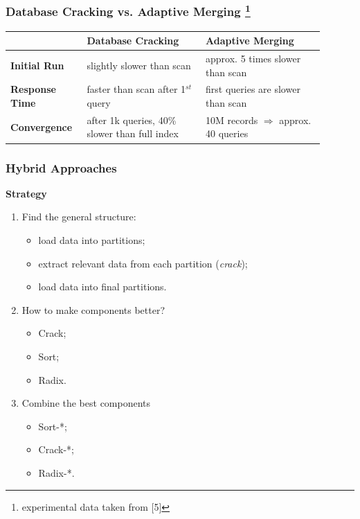 \documentclass{beamer}
\begin{document}
\begin{frame}
\frametitle{Database Cracking vs. Adaptive Merging \footnote{experimental data taken from [5]}}
\begin{tabular}{| M{0.2\linewidth} | M{0.35\linewidth} | M{0.35\linewidth} |}
\hline 
 & \textbf{Database Cracking} & \textbf{Adaptive Merging} \\ 
\hline 
\textbf{Initial Run} & \color{green} slightly slower than scan & \color{red} approx. 5 times slower than scan \\ 
\hline 
\textbf{Response Time} & \color{green} faster than scan after 1$^{st}$ query & \color{red} first queries are slower than scan \\ 
\hline 
\textbf{Convergence} & \color{red} after 1k queries, 40\% slower than full index & \color{green} 10M records $\Rightarrow$ approx. 40 queries \\ 
\hline 
\end{tabular} 
\end{frame}

\begin{frame}
\frametitle{Hybrid Approaches}
\textbf{Strategy} \pause
\begin{enumerate}
\item{Find the general structure:}
\begin{itemize}
\item{load data into partitions;}
\item{extract relevant data from each partition (\textit{crack});}
\item{load data into final partitions.}
\end{itemize}
\pause
\item{How to make components better?}
\begin{itemize}
\item{Crack;}
\item{Sort;}
\item{Radix.}
\end{itemize}
\pause
\item{Combine the best components}
\begin{itemize}
\item{Sort-*;}
\item{Crack-*;}
\item{Radix-*.}
\end{itemize}
\end{enumerate}
\end{frame}
\end{document}
